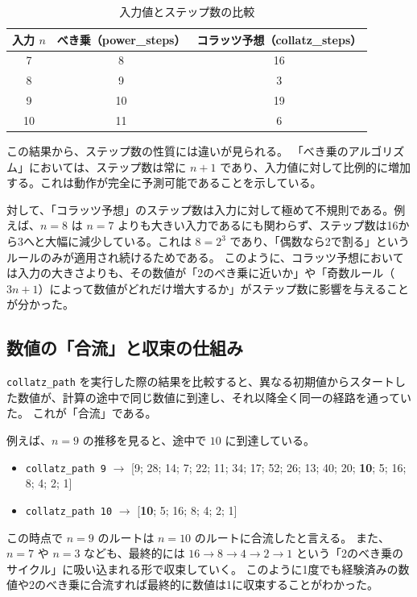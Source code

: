 \documentclass[titlepage]{ltjsarticle}
\begin{document}
\begin{table}[h]
\centering
\begin{tabular}{|c|c|c|}
\hline
入力 $n$ & べき乗（power\_steps） & コラッツ予想（collatz\_steps） \\ \hline
7 & 8 & 16 \\ \hline
8 & 9 & 3 \\ \hline
9 & 10 & 19 \\ \hline
10 & 11 & 6 \\ \hline
\end{tabular}
\caption{入力値とステップ数の比較}
\end{table}

\clearpage
この結果から、ステップ数の性質には違いが見られる。
「べき乗のアルゴリズム」においては、ステップ数は常に $n+1$ であり、入力値に対して比例的に増加する。これは動作が完全に予測可能であることを示している。

対して、「コラッツ予想」のステップ数は入力に対して極めて不規則である。例えば、$n=8$ は $n=7$ よりも大きい入力であるにも関わらず、ステップ数は16から3へと大幅に減少している。これは $8 = 2^3$ であり、「偶数なら2で割る」というルールのみが適用され続けるためである。
このように、コラッツ予想においては入力の大きさよりも、その数値が「2のべき乗に近いか」や「奇数ルール（$3n+1$）によって数値がどれだけ増大するか」がステップ数に影響を与えることが分かった。

\subsection{数値の「合流」と収束の仕組み}
\texttt{collatz\_path} を実行した際の結果を比較すると、異なる初期値からスタートした数値が、計算の途中で同じ数値に到達し、それ以降全く同一の経路を通っていた。
これが「合流」である。

例えば、$n=9$ の推移を見ると、途中で $10$ に到達している。
\begin{itemize}
    \item \texttt{collatz\_path 9} $\rightarrow$ [9; 28; 14; 7; 22; 11; 34; 17; 52; 26; 13; 40; 20; \textbf{10}; 5; 16; 8; 4; 2; 1]
    \item \texttt{collatz\_path 10} $\rightarrow$ [\textbf{10}; 5; 16; 8; 4; 2; 1]
\end{itemize}
この時点で $n=9$ のルートは $n=10$ のルートに合流したと言える。
また、$n=7$ や $n=3$ なども、最終的には $16 \to 8 \to 4 \to 2 \to 1$ という「2のべき乗のサイクル」に吸い込まれる形で収束していく。
このように1度でも経験済みの数値や2のべき乗に合流すれば最終的に数値は1に収束することがわかった。
\end{document}
